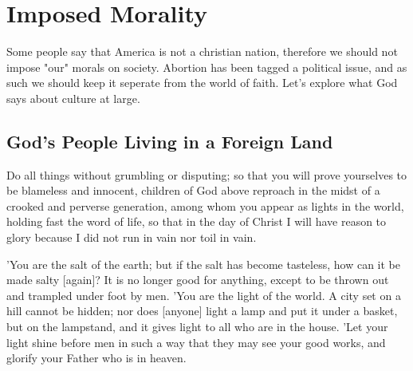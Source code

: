 \chapter{Imposed Morality}

Some people say that America is not a christian nation, therefore we should not impose "our" morals on society. Abortion has been 
tagged a political issue, and as such we should keep it seperate from the world of faith. Let's explore what God says about culture at large. 

\section{God's People Living in a Foreign Land}

\begin{scripture}[Philippians 2:14-16]
    Do all things without grumbling or disputing;
    so that you will prove yourselves to be blameless and innocent, children of God above reproach in the midst of a crooked and perverse generation, among whom you appear as lights in the world,
    holding fast the word of life, so that in the day of Christ I will have reason to glory because I did not run in vain nor toil in vain.
\end{scripture}

\vspace{2\baselineskip}

\begin{scripture}[Matthew 5:13-16]
    'You are the salt of the earth; but if the salt has become tasteless, how can it be made salty [again]? It is no longer good for anything, except to be thrown out and trampled under foot by men.
    'You are the light of the world. A city set on a hill cannot be hidden;
    nor does [anyone] light a lamp and put it under a basket, but on the lampstand, and it gives light to all who are in the house.
    'Let your light shine before men in such a way that they may see your good works, and glorify your Father who is in heaven.
\end{scripture}

